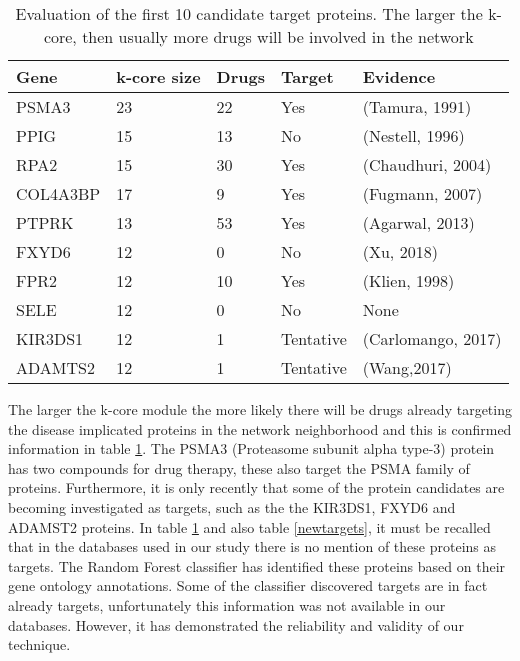 \documentclass[a4paper,8pt,twocolumn,5p]{elsarticle}
\begin{document}
\begin{table}[h]
\centering \scriptsize \caption{Evaluation of the first 10 candidate target proteins. The larger the k-core, then usually more drugs will be involved in the network }
\label{evaluate}
\begin{tabular}{lllll}
  \hline
 Gene & k-core size & Drugs & Target & Evidence\\ 
  \hline
PSMA3  & 23 & 22 & Yes & (Tamura, 1991) \\ 
PPIG & 15 & 13 & No & (Nestell, 1996) \\ 
RPA2 & 15 & 30 & Yes & (Chaudhuri, 2004)\\ 
COL4A3BP & 17  &  9   & Yes & (Fugmann, 2007)\\
PTPRK & 13 & 53 & Yes & (Agarwal, 2013)\\ 
FXYD6 & 12 & 0 & No & (Xu, 2018)\\ 
FPR2 & 12 & 10 & Yes & (Klien, 1998)\\ 
SELE & 12 & 0 & No & None\\ 
KIR3DS1 & 12 & 1 & Tentative & (Carlomango, 2017)\\ 
ADAMTS2 & 12 & 1 & Tentative& (Wang,2017)\\ 
    \hline
\end{tabular}
\end{table}
\normalsize

The larger the k-core module the more likely there will be drugs already targeting the disease implicated proteins in the network neighborhood and this is confirmed information in table \ref{evaluate}. The PSMA3 (Proteasome subunit alpha type-3) protein  has two compounds for drug therapy, these also target the PSMA family of proteins. Furthermore, it is only recently that some of the protein candidates are becoming investigated as targets, such as the the KIR3DS1, FXYD6 and ADAMST2 proteins. In table \ref{evaluate} and also table \ref{newtargets}, it must be recalled that in the databases used in our study there is no mention of these proteins as targets. The Random Forest classifier has identified these proteins based on their gene ontology annotations. Some of the classifier discovered targets are in fact already targets, unfortunately this information was not available in our databases.  However, it has demonstrated the reliability and validity of our technique. 
\end{document}
